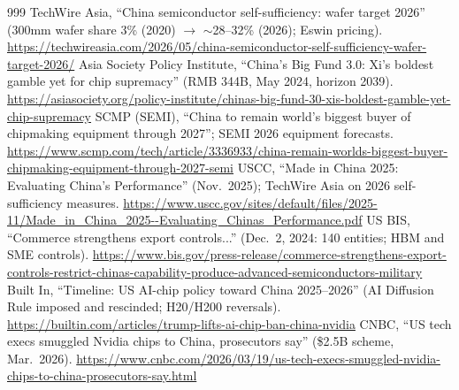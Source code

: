 \begin{thebibliography}{999}
 TechWire Asia, ``China semiconductor self-sufficiency: wafer target 2026'' (300mm wafer share 3\% (2020) $\rightarrow$ $\sim$28--32\% (2026); Eswin pricing). \url{https://techwireasia.com/2026/05/china-semiconductor-self-sufficiency-wafer-target-2026/}
 Asia Society Policy Institute, ``China's Big Fund 3.0: Xi's boldest gamble yet for chip supremacy'' (RMB 344B, May 2024, horizon 2039). \url{https://asiasociety.org/policy-institute/chinas-big-fund-30-xis-boldest-gamble-yet-chip-supremacy}
 SCMP (SEMI), ``China to remain world's biggest buyer of chipmaking equipment through 2027''; SEMI 2026 equipment forecasts. \url{https://www.scmp.com/tech/article/3336933/china-remain-worlds-biggest-buyer-chipmaking-equipment-through-2027-semi}
 USCC, ``Made in China 2025: Evaluating China's Performance'' (Nov.\ 2025); TechWire Asia on 2026 self-sufficiency measures. \url{https://www.uscc.gov/sites/default/files/2025-11/Made_in_China_2025--Evaluating_Chinas_Performance.pdf}
 US BIS, ``Commerce strengthens export controls...'' (Dec.\ 2, 2024: 140 entities; HBM and SME controls). \url{https://www.bis.gov/press-release/commerce-strengthens-export-controls-restrict-chinas-capability-produce-advanced-semiconductors-military}
 Built In, ``Timeline: US AI-chip policy toward China 2025--2026'' (AI Diffusion Rule imposed and rescinded; H20/H200 reversals). \url{https://builtin.com/articles/trump-lifts-ai-chip-ban-china-nvidia}
 CNBC, ``US tech execs smuggled Nvidia chips to China, prosecutors say'' (\$2.5B scheme, Mar.\ 2026). \url{https://www.cnbc.com/2026/03/19/us-tech-execs-smuggled-nvidia-chips-to-china-prosecutors-say.html}


\end{thebibliography}
